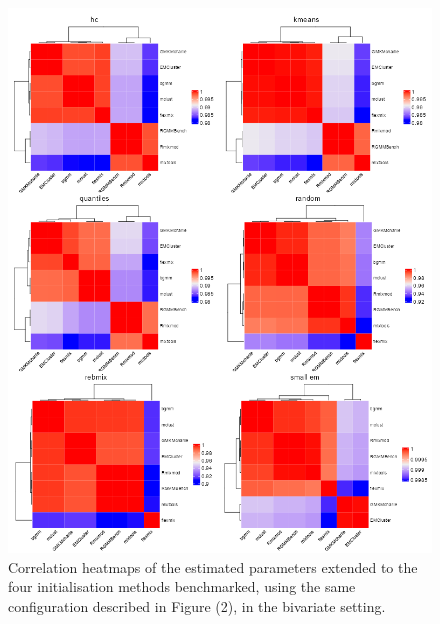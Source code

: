 \newpage
\begin{figure}

{\centering \includegraphics[width=1\linewidth]{./figs/univariate/heatmap_univariate} 

}

\caption{Correlation heatmaps of the estimated parameters extended to the four initialisation methods benchmarked, using the same configuration described in Figure (2), in the bivariate setting.}\label{fig:heatmap-all-correlation-plots-univariate}
\end{figure}

